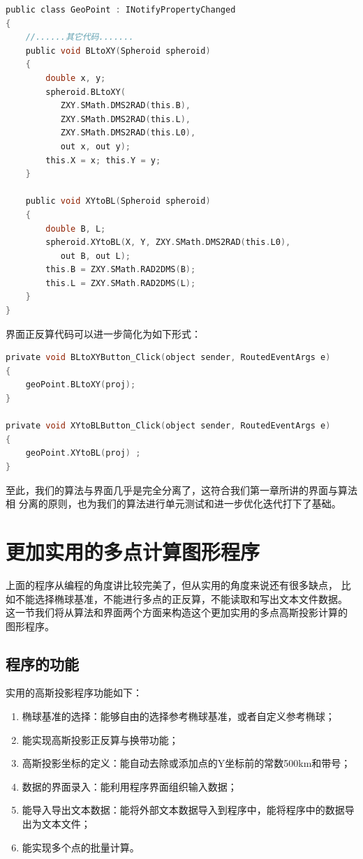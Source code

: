 \begin{lstlisting}[language=C]
public class GeoPoint : INotifyPropertyChanged
{
    //......其它代码.......
    public void BLtoXY(Spheroid spheroid)
    {
        double x, y;
        spheroid.BLtoXY(
           ZXY.SMath.DMS2RAD(this.B),
           ZXY.SMath.DMS2RAD(this.L),
           ZXY.SMath.DMS2RAD(this.L0),
           out x, out y);
        this.X = x; this.Y = y;
    }

    public void XYtoBL(Spheroid spheroid)
    {
        double B, L;
        spheroid.XYtoBL(X, Y, ZXY.SMath.DMS2RAD(this.L0),
           out B, out L);
        this.B = ZXY.SMath.RAD2DMS(B);
        this.L = ZXY.SMath.RAD2DMS(L);
    }
}
\end{lstlisting}

界面正反算代码可以进一步简化为如下形式：

\begin{lstlisting}[language=C]
private void BLtoXYButton_Click(object sender, RoutedEventArgs e)
{
    geoPoint.BLtoXY(proj);
}

private void XYtoBLButton_Click(object sender, RoutedEventArgs e)
{
    geoPoint.XYtoBL(proj) ;
}
\end{lstlisting}

至此，我们的算法与界面几乎是完全分离了，这符合我们第一章所讲的界面与算法相
分离的原则，也为我们的算法进行单元测试和进一步优化迭代打下了基础。


\section{更加实用的多点计算图形程序}

上面的程序从编程的角度讲比较完美了，但从实用的角度来说还有很多缺点，
比如不能选择椭球基准，不能进行多点的正反算，不能读取和写出文本文件数据。
这一节我们将从算法和界面两个方面来构造这个更加实用的多点高斯投影计算的
图形程序。

\subsection{程序的功能}

实用的高斯投影程序功能如下：

\begin{enumerate}
\item 椭球基准的选择：能够自由的选择参考椭球基准，或者自定义参考椭球；
\item 能实现高斯投影正反算与换带功能；
\item 高斯投影坐标的定义：能自动去除或添加点的Y坐标前的常数500km和带号；
\item 数据的界面录入：能利用程序界面组织输入数据；
\item 能导入导出文本数据：能将外部文本数据导入到程序中，能将程序中的数据导出为文本文件；
\item 能实现多个点的批量计算。
\end{enumerate}

